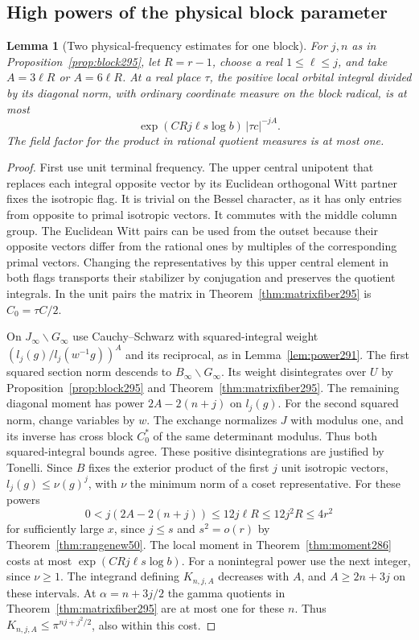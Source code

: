 \documentclass[a4paper,11pt]{article}
\newtheorem{lemma}[proposition]{Lemma}
\theoremstyle{definition}
\theoremstyle{remark}
\numberwithin{equation}{section}
\begin{document}
\subsection{High powers of the physical block parameter}\label{nav:VI-54}
\begin{lemma}[Two physical-frequency estimates for one block]\leavevmode
\label{lem:blockphysical295}
For \(j,n\) as in Proposition~\ref{prop:block295}, let
\(R=r-1\), choose a real \(1\le\ell\le j\), and take
\(A=3\ell R\) or \(A=6\ell R\). At a real
place \(\tau\), the positive local orbital integral divided
by its diagonal norm, with ordinary coordinate measure on
the block radical, is at most
\[
     \exp(C Rj\ell s\log b)\,|\tau c|^{-jA}.
\]
The field factor for the product in rational quotient
measures is at most one.
\end{lemma}
\begin{proof}
First use unit terminal frequency. The upper central
unipotent that replaces each integral opposite vector
by its Euclidean orthogonal Witt partner fixes the
isotropic flag. It is trivial on the Bessel character,
as it has only entries from opposite to primal isotropic
vectors. It commutes with the middle column group.
The Euclidean Witt pairs can be used from the outset
because their opposite vectors differ from the
rational ones by multiples of the corresponding primal
vectors. Changing the representatives by this upper
central element in both flags transports their stabilizer
by conjugation and preserves the quotient integrals.
In the unit pairs the matrix in
Theorem~\ref{thm:matrixfiber295} is \(C_0=\tau C/2\).

On \(J_\infty\backslash G_\infty\) use Cauchy--Schwarz
with squared-integral weight
\((l_j(g)/l_j(w^{-1}g))^A\) and its reciprocal, as in
Lemma~\ref{lem:power291}. The first squared section norm
descends to \(B_\infty\backslash G_\infty\). Its weight
disintegrates over \(U\) by Proposition~\ref{prop:block295}
and Theorem~\ref{thm:matrixfiber295}. The remaining
diagonal moment has power \(2A-2(n+j)\) on \(l_j(g)\).
For the second squared norm, change variables by \(w\).
The exchange normalizes \(J\) with modulus one, and its
inverse has cross block \(C_0^*\) of the same determinant
modulus. Thus both squared-integral bounds agree.
These positive disintegrations are justified by Tonelli.
Since \(B\) fixes the exterior product of the first \(j\)
unit isotropic vectors,
\(l_j(g)\le\nu(g)^j\), with \(\nu\) the minimum norm of a
coset representative. For these powers
\[
       0<j(2A-2(n+j))\le 12j\ell R\le12j^2R\le4r^2
\]
for sufficiently large \(x\), since \(j\le s\) and
\(s^2=o(r)\) by Theorem~\ref{thm:rangenew50}. The
local moment in Theorem~\ref{thm:moment286} costs at
most \(\exp(CRj\ell s\log b)\). For a nonintegral power
use the next integer, since \(\nu\ge1\).
The integrand defining
\(K_{n,j,A}\) decreases with \(A\), and \(A\ge2n+3j\)
on these intervals. At \(\alpha=n+3j/2\) the gamma
quotients in Theorem~\ref{thm:matrixfiber295} are at
most one for these \(n\). Thus
\(K_{n,j,A}\le\pi^{nj+j^2/2}\), also within this cost.


\end{proof}
\end{document}
